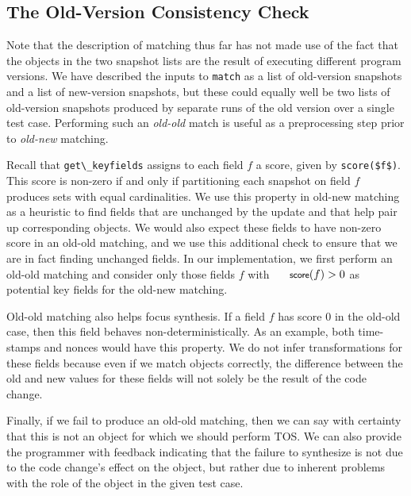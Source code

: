\documentclass[natbib,10pt]{sigplanconf}
\newcommand{\code}[1]{\lstinline|#1|\xspace}
\newcommand{\TOS}{TOS\xspace}
\newcommand{\kathryn}[1]{\textcolor{blue}{Kathryn: #1}}
\newcommand{\mwh}[1]{\textcolor{blue}{Mike: #1}}
\begin{document}

\subsection{The Old-Version Consistency Check}

Note that the description of matching thus far has not made use of the
fact that the objects in the two snapshot lists are the result of executing
different program versions.  We have described the
inputs to \code{match} as a list of old-version snapshots and a list
of new-version snapshots, but these could equally well be two lists of
old-version snapshots produced by separate runs of the old version
over a single test case.  Performing such an \textit{old-old} match is
useful as a preprocessing step prior to \textit{old-new} matching.

Recall that \code{get\_keyfields} assigns to each field $f$ a score,
given by \code{score($f$)}.  This score is non-zero if and only if
partitioning each snapshot on field $f$ produces sets with equal
cardinalities.  We use this property in old-new matching as a heuristic to find
fields that are unchanged by the update and that help pair up
corresponding objects.  We would also expect these fields to have
non-zero score in an old-old matching, and we use this additional 
check to ensure that we are in fact finding unchanged
fields.  In our implementation, we first perform an old-old matching
and consider only those fields $f$ with $\textsf{\small{score}}(f) {} > 0$ as
potential key fields for the old-new matching.

Old-old matching also helps focus synthesis.  If a field $f$
has score $0$ in the old-old case, then this field behaves
non-deterministically.  As an example, both time-stamps and nonces would have this
property.  We do not infer transformations for these fields
because even if we match objects correctly, the difference between the old
and new values for these fields will not solely be the result of the
code change.

Finally, if we fail to produce an old-old matching, then we can
say with certainty that this is not an object for which we should
perform \TOS.  We can also provide the programmer with
feedback indicating that the failure to synthesize is not due to the
code change's effect on the object, but rather due to inherent
problems with the role of the object in the given test case.
\end{document}
